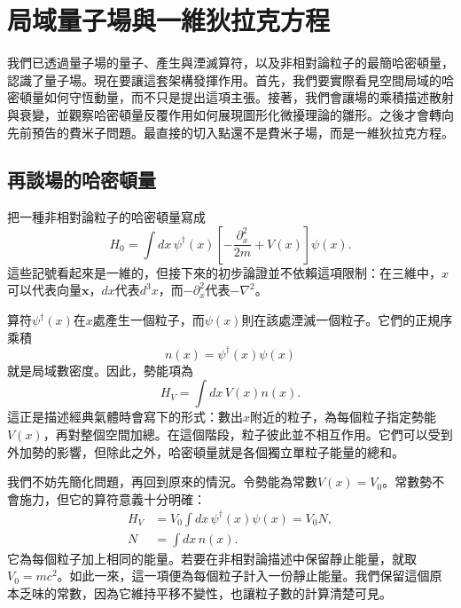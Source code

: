 \chapter{局域量子場與一維狄拉克方程}

我們已透過量子場的量子、產生與湮滅算符，以及非相對論粒子的最簡哈密頓量，認識了量子場。現在要讓這套架構發揮作用。首先，我們要實際看見空間局域的哈密頓量如何守恆動量，而不只是提出這項主張。接著，我們會讓場的乘積描述散射與衰變，並觀察哈密頓量反覆作用如何展現圖形化微擾理論的雛形。之後才會轉向先前預告的費米子問題。最直接的切入點還不是費米子場，而是一維狄拉克方程。

\section{再談場的哈密頓量}

把一種非相對論粒子的哈密頓量寫成
\begin{equation}
H_0=\int dx\,
\psi^\dagger(x)
\left[-\frac{\partial_x^2}{2m}+V(x)\right]
\psi(x).
\label{eq:l9-nonrel-hamiltonian}
\end{equation}
這些記號看起來是一維的，但接下來的初步論證並不依賴這項限制：在三維中，\(x\)可以代表向量\(\mathbf{x}\)，\(dx\)代表\(d^3x\)，而\(-\partial_x^2\)代表\(-\nabla^2\)。

算符\(\psi^\dagger(x)\)在\(x\)處產生一個粒子，而\(\psi(x)\)則在該處湮滅一個粒子。它們的正規序乘積
\begin{equation}
n(x)=\psi^\dagger(x)\psi(x)
\end{equation}
就是局域數密度。因此，勢能項為
\begin{equation}
H_V=\int dx\,V(x)n(x).
\end{equation}
這正是描述經典氣體時會寫下的形式：數出\(x\)附近的粒子，為每個粒子指定勢能\(V(x)\)，再對整個空間加總。在這個階段，粒子彼此並不相互作用。它們可以受到外加勢的影響，但除此之外，哈密頓量就是各個獨立單粒子能量的總和。

我們不妨先簡化問題，再回到原來的情況。令勢能為常數\(V(x)=V_0\)。常數勢不會施力，但它的算符意義十分明確：
\begin{equation}
\begin{aligned}
H_V&=V_0\int dx\,\psi^\dagger(x)\psi(x)=V_0N,\\
N&=\int dx\,n(x).
\end{aligned}
\end{equation}
它為每個粒子加上相同的能量。若要在非相對論描述中保留靜止能量，就取\(V_0=mc^2\)。如此一來，這一項便為每個粒子計入一份靜止能量。我們保留這個原本乏味的常數，因為它維持平移不變性，也讓粒子數的計算清楚可見。

